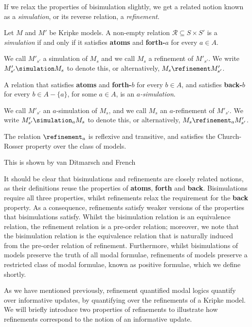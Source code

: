 If we relax the properties of bisimulation slightly, we get a related notion
known as a {\em simulation}, or its reverse relation, a {\em refinement}.

\begin{definition}
Let $M$ and $M'$ be Kripke models. A non-empty relation $\mathcal{R}
\subseteq S \times S'$ is a \textit{simulation} if and only if it satisfies {\bf
atoms} and {\bf forth-$a$} for every $a \in A$.

We call $M'_{s'}$ a simulation of $M_s$ and we call $M_s$ a refinement of
$M'_{s'}$. We write $M'_{s'} \simulation M_s$ to denote this, or alternatively,
$M_s \refinement M'_{s'}$.

A relation that satisfies {\bf atoms} and {\bf forth-$b$} for every $b \in A$,
and satisfies {\bf back-$b$} for every $b \in A - \{a\}$, for some $a \in A$, is
an $a$\textit{-simulation}. 

We call $M'_{s'}$ an $a$-simulation of $M_s$, and we call $M_s$ an
$a$-refinement of $M'_{s'}$. We write $M'_{s'} \simulation_a M_s$ to denote
this, or alternatively, $M_s \refinement_a M'_{s'}$.
\end{definition}

\begin{lemma}\label{semantics-preorder}
The relation $\refinement_a$ is reflexive and transitive, and satisfies the
Church-Rosser property over the class of \classK{} models.
\end{lemma}

This is shown by van Ditmarsch and French~\cite{french2009simulation}

It should be clear that bisimulations and refinements are closely related
notions, as their definitions reuse the properties of {\bf atoms}, {\bf forth}
and {\bf back}. Bisimulations require all three properties, whilst refinements
relax the requirement for the {\bf back} property. As a consequence, refinements
satisfy weaker versions of the properties that bisimulations satisfy. Whilst the
bisimulation relation is an equivalence relation, the refinement relation is a
pre-order relation; moreover, we note that the bisimulation relation is the
equivalence relation that is naturally induced from the pre-order relation of
refinement. Furthermore, whilst bisimulations of models preserve the truth of
all modal formulae, refinements of models preserve a restricted class of modal
formulae, known as positive formulae, which we define shortly.

As we have mentioned previously, refinement quantified modal logics quantify
over informative updates, by quantifying over the refinements of a Kripke model.
We will briefly introduce two properties of refinements to illustrate how
refinements correspond to the notion of an informative update.

